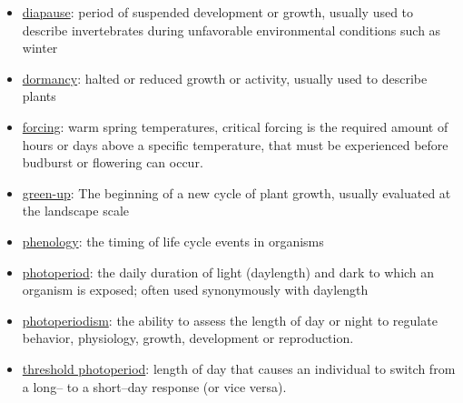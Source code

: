 \documentclass{article}
\begin{document}
\begin{itemize}
\item \underline{diapause}: period of suspended development or growth, usually used to describe invertebrates during unfavorable environmental conditions such as winter
\item \underline{dormancy}: halted or reduced growth or activity, usually used to describe plants
\item \underline{forcing}: warm spring temperatures, critical forcing is the required amount of hours or days above a specific temperature, that must be experienced before budburst or flowering can occur.
\item \underline{green-up}: The beginning of a new cycle of plant growth, usually evaluated at the landscape scale
\item \underline{phenology}: the timing of life cycle events in organisms
\item \underline{photoperiod}: the daily duration of light (daylength) and dark to which an organism is exposed; often used synonymously with daylength
\item \underline{photoperiodism}: the ability to assess the length of day or night to regulate behavior, physiology, growth, development or reproduction.
\item \underline{threshold photoperiod}: length of day that causes an individual to switch from a long-- to a short--day response (or vice versa).
\end{itemize}
\end{document}

